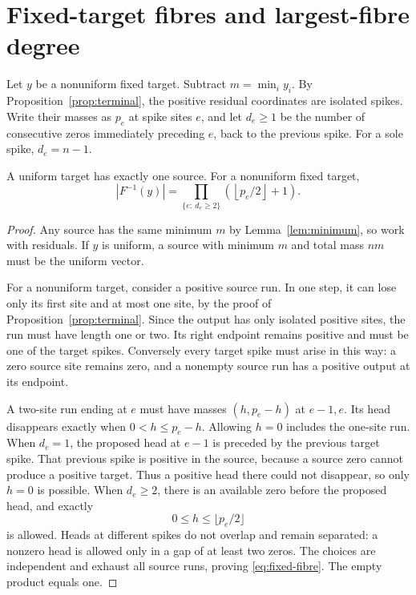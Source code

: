 \section{Fixed-target fibres and largest-fibre degree}\label{sec:fibres}
Let $y$ be a nonuniform fixed target. Subtract $m=\min_i y_i$.
By Proposition~\ref{prop:terminal}, the positive residual coordinates are
isolated spikes. Write their masses as $p_e$ at spike sites $e$, and
let $d_e\ge1$ be the number of consecutive zeros immediately preceding
$e$, back to the previous spike. For a sole spike, $d_e=n-1$.

\begin{proposition}\label{prop:fixed-fibre}
A uniform target has exactly one source. For a nonuniform fixed target,
\begin{equation}\label{eq:fixed-fibre}
 |F^{-1}(y)|=
 \prod_{\{e:\ d_e\ge2\}}\left(\left\lfloor p_e/2\right\rfloor+1\right).
\end{equation}
\end{proposition}
\begin{proof}
Any source has the same minimum $m$ by Lemma~\ref{lem:minimum}, so work
with residuals. If $y$ is uniform, a source with minimum $m$ and total
mass $nm$ must be the uniform vector.

For a nonuniform target, consider a positive source run. In one step,
it can lose only its first site and at most one site, by the proof of
Proposition~\ref{prop:terminal}. Since the output has only isolated
positive sites, the run must have length one or two. Its right endpoint
remains positive and must be one of the target spikes. Conversely every
target spike must arise in this way: a zero source site remains zero,
and a nonempty source run has a positive output at its endpoint.

A two-site run ending at $e$ must have masses
$(h,p_e-h)$ at $e-1,e$. Its head disappears exactly when
$0<h\le p_e-h$. Allowing $h=0$ includes the one-site run.
When $d_e=1$, the proposed head at $e-1$ is preceded by the previous
target spike. That previous spike is positive in the source, because
a source zero cannot produce a positive target. Thus a positive head
there could not disappear, so only $h=0$ is possible.
When $d_e\ge2$, there is an available zero before the proposed head,
and exactly
\[
 0\le h\le\lfloor p_e/2\rfloor
\]
is allowed. Heads at different spikes do not overlap and remain separated:
a nonzero head is allowed only in a gap of at least two zeros.
The choices are independent and exhaust all source runs, proving
\eqref{eq:fixed-fibre}. The empty product equals one.
\end{proof}

